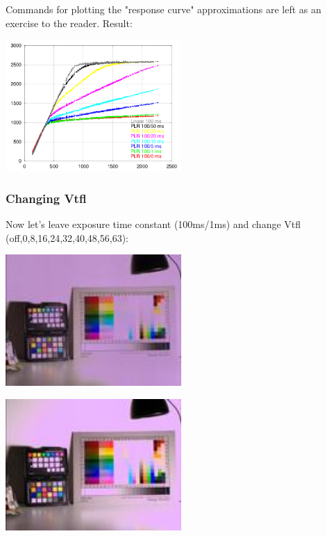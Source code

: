 Commands for plotting the "response curve" approximations are left as an exercise to the reader. Result: 

\begin{center}
\includegraphics[height=5cm]{images/100-x-32-plr-vs-30ms-lin}
\end{center}

\subsubsection{Changing Vtfl}

Now let's leave exposure time constant (100ms/1ms) and change Vtfl (off,0,8,16,24,32,40,48,56,63): 

\begin{center}
\includegraphics[height=5cm]{images/100ms-1ms-00-tiny}
\end{center}

\begin{center}
\includegraphics[height=5cm]{images/100ms-1ms-0-tiny}
\end{center}

